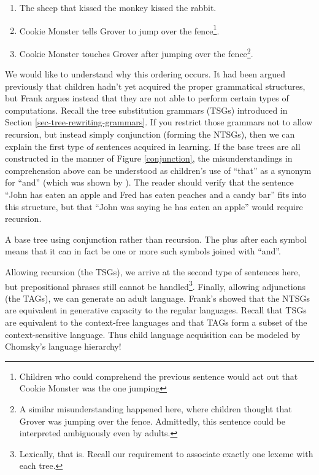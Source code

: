 \documentclass[12pt]{article}
\begin{document}
\begin{enumerate}
\item The sheep that kissed the monkey kissed the rabbit.
\item Cookie Monster tells Grover to jump over the
fence\footnote{Children who could comprehend the previous sentence would
act out that Cookie Monster was the one jumping}. 
\item Cookie Monster touches Grover after jumping over the
fence\footnote{A similar misunderstanding happened here, where children
thought that Grover was jumping over the fence.  Admittedly, this
sentence could be interpreted ambiguously even by adults.}.
\end{enumerate}

We would like to understand why this ordering occurs.  It had been
argued previously that children hadn't yet acquired the proper
grammatical structures, but Frank argues instead that they are not able
to perform certain types of computations.  Recall the tree substitution
grammars (TSGs) introduced in Section \ref{sec-tree-rewriting-grammars}.
If you restrict those grammars not to allow recursion, but instead
simply conjunction (forming the NTSGs), then we can explain the first
type of sentences acquired in learning. If the base trees are all
constructed in the manner of Figure \ref{conjunction}, the
misunderstandings in comprehension above can be understood as children's
use of ``that'' as a synonym for ``and'' (which was shown by
\cite{Bloom-1980}).  The reader should verify that the sentence ``John
has eaten an apple and Fred has eaten peaches and a candy bar'' fits
into this structure, but that ``John was saying he has eaten an apple''
would require recursion.

\begin{Figure}
\begin{center}
\end{center}
\caption{A base tree using conjunction rather than recursion.  The plus
after each symbol means that it can in fact be one or more such symbols
joined with ``and''.}
\label{conjunction}
\end{Figure}

Allowing recursion (the TSGs), we arrive at the second type of sentences
here, but prepositional phrases still cannot be
handled\footnote{Lexically, that is.  Recall our requirement to
associate exactly one lexeme with each tree.}.  Finally, allowing
adjunctions (the TAGs), we can generate an adult language.  Frank's
showed that the NTSGs are equivalent in generative capacity to the
regular languages.  Recall that TSGs are equivalent to the context-free
languages and that TAGs form a subset of the context-sensitive language.
Thus child language acquisition can be modeled by Chomsky's language
hierarchy!
\end{document}
